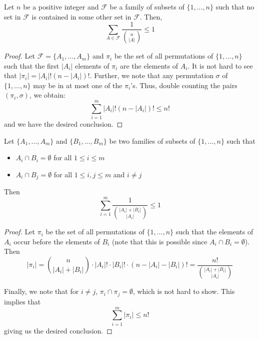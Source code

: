 \begin{lemma}
    Let $n$ be a positive integer and $\mathcal{F}$ be a family of subsets of $\{1,\ldots,n\}$ such that no set in $\mathcal{F}$ is contained in some other set in $\mathcal{F}$. Then, 
    \begin{equation*}
        \sum_{A\in\mathcal{F}}\frac{1}{\binom{n}{|A|}}\le1
    \end{equation*}
\end{lemma}
\begin{proof}
    Let $\mathcal{F} = \{A_1,\ldots,A_m\}$ and $\pi_i$ be the set of all permutations of $\{1,\ldots,n\}$ such that the first $|A_i|$ elements of $\pi_i$ are the elements of $A_i$. It is not hard to see that $|\pi_i| = |A_i|!(n - |A_i|)!$. Further, we note that any permutation $\sigma$ of $\{1,\ldots,n\}$ may be in at most one of the $\pi_i$'s. Thus, double counting the pairs $(\pi_i,\sigma)$, we obtain:
    \begin{equation*}
        \sum_{i=1}^m|A_i|!(n - |A_i|)!\le n!
    \end{equation*}
    and we have the desired conclusion.
\end{proof}

\begin{theorem}[Bollob\'as, 1965]
    Let $\{A_1,\ldots, A_m\}$ and $\{B_1,\ldots,B_m\}$ be two families of subsets of $\{1,\ldots,n\}$ such that 
    \begin{itemize}
        \item $A_i\cap B_i = \emptyset$ for all $1\le i\le m$
        \item $A_i\cap B_j = \emptyset$ for all $1\le i, j\le m$ and $i\ne j$
    \end{itemize}
    Then 
    \begin{equation*}
        \sum_{i=1}^m\frac{1}{\binom{|A_i| + |B_i|}{|A_i|}}\le 1
    \end{equation*}
\end{theorem}
\begin{proof}
    Let $\pi_i$ be the set of all permutations of $\{1,\ldots,n\}$ such that the elements of $A_i$ occur before the elements of $B_i$ (note that this is possible since $A_i\cap B_i = \emptyset$). Then 
    \begin{equation*}
        |\pi_i| = \binom{n}{|A_i| + |B_i|}\cdot|A_i|!\cdot|B_i|!\cdot(n - |A_i| - |B_i|)! = \frac{n!}{\binom{|A_i| + |B_i|}{|A_i|}}
    \end{equation*}

    Finally, we note that for $i\ne j$, $\pi_i\cap\pi_j=\emptyset$, which is not hard to show. This implies that 
    \begin{equation*}
        \sum_{i=1}^m|\pi_i|\le n!
    \end{equation*}
    giving us the desired conclusion.
\end{proof}

